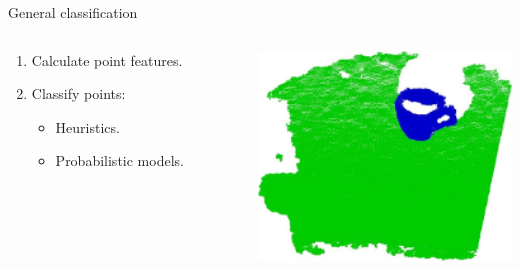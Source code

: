 \documentclass{beamer}
\begin{document}
\begin{frame}{General classification}

\begin{columns}[T]
\begin{column}{0.5\textwidth}

\begin{enumerate}
\item Calculate point features.
\item Classify points:
\begin{itemize}
\item Heuristics.
\item Probabilistic models.
\end{itemize}
\end{enumerate}

\end{column}

\begin{column}{0.5\textwidth}

\includegraphics[width=1\textwidth]{pics/segmentation.png}

\end{column}

\end{columns}


\end{frame}
\end{document}
